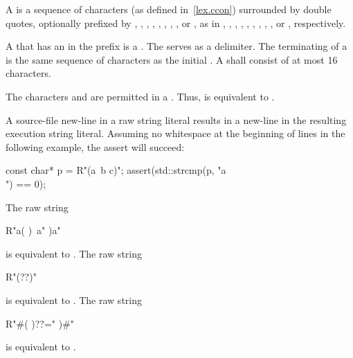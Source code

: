\pnum
{}%
%
%
%
%
%
A  is a sequence of characters (as defined
in~\ref{lex.ccon}) surrounded by double quotes, optionally prefixed by
,
,
,
,
,
,
,
,
or ,
as in
,
,
,
,
,
,
,
,
,
or ,
respectively.

\pnum
{}%
A  that has an 
%
in the prefix is a . The
 serves as a delimiter. The terminating
 of a  is the same sequence of
characters as the initial . A 
shall consist of at most 16 characters.

\pnum
\begin{note} The characters  and  are permitted in a
. Thus,  is equivalent to
. \end{note}

\pnum
\begin{note} A source-file new-line in a raw string literal results in a new-line in the
resulting execution string literal. Assuming no
whitespace at the beginning of lines in the following example, the assert will succeed:

\begin{codeblock}
const char* p = R"(a\
b
c)";
assert(std::strcmp(p, "a\\\nb\nc") == 0);
\end{codeblock}
\end{note}

\pnum
\begin{example} The raw string

\begin{codeblock}
R"a(
)\
a"
)a"
\end{codeblock}

is equivalent to . The raw string

\begin{codeblock}
R"(??)"
\end{codeblock}

is equivalent to . The raw string

\begin{codeblock}
R"#(
)??="
)#"
\end{codeblock}

is equivalent to . \end{example}


